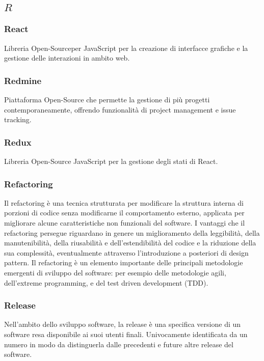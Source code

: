 \subsection*{\quad$R\quad$}
\subsubsection*{React}
Libreria Open-Source\glosp per JavaScript per la creazione di interfacce grafiche e la gestione delle interazioni in ambito web.

\subsubsection*{Redmine}
Piattaforma Open-Source che permette la gestione di più progetti contemporaneamente, offrendo funzionalità di project management e issue tracking.

\subsubsection*{Redux}
Libreria Open-Source JavaScript per la gestione degli stati di React\glo.

\subsubsection*{Refactoring}
Il refactoring è una tecnica strutturata per modificare la struttura interna di porzioni di codice senza modificarne il comportamento esterno, applicata per migliorare alcune caratteristiche non funzionali del software. I vantaggi che il refactoring persegue riguardano in genere un miglioramento della leggibilità, della manutenibilità, della riusabilità e dell'estendibilità del codice e la riduzione della sua complessità, eventualmente attraverso l'introduzione a posteriori di design pattern. Il refactoring è un elemento importante delle principali metodologie emergenti di sviluppo del software: per esempio delle metodologie agili, dell'extreme programming, e del test driven development (TDD).

\subsubsection*{Release}
Nell'ambito dello sviluppo software, la release è una specifica versione di un software resa disponibile ai suoi utenti finali. Univocamente identificata da un numero in modo da distinguerla dalle precedenti e future altre release del software.


